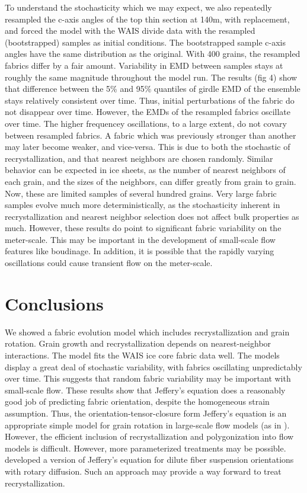 \documentclass{igs}
\begin{document}
To understand the stochasticity which we may expect, we also repeatedly resampled the c-axis angles of the top thin section at 140m, with replacement, and forced the model with the WAIS divide data with the resampled (bootstrapped) samples as initial conditions. The bootstrapped sample c-axis angles have the same distribution as the original. With 400 grains, the resampled fabrics differ by a fair amount. Variability in EMD between samples stays at roughly the same magnitude throughout the model run. The results (fig 4) show that difference between the 5\% and 95\% quantiles of girdle EMD of the ensemble stays relatively consistent over time. Thus, initial perturbations of the fabric do not disappear over time.  However, the EMDs of the resampled fabrics oscillate over time. The higher frequencey oscillations, to a large extent, do not covary between resampled fabrics. A fabric which was previously stronger than another may later become weaker, and vice-versa. This is due to both the stochastic of recrystallization, and that nearest neighbors are chosen randomly. Similar behavior can be expected in ice sheets, as the number of nearest neighbors of each grain, and the sizes of the neighbors, can differ greatly from grain to grain. Now, these are limited samples of several hundred grains. Very large fabric samples evolve much more deterministically, as the stochasticity inherent in recrystallization and nearest neighbor selection does not affect bulk properties as much. However, these results do point to significant fabric variability on the meter-scale. This may be important in the development of small-scale flow features like boudinage. In addition, it is possible that the rapidly varying oscillations could cause transient flow on the meter-scale. 


\section{Conclusions}
We showed a fabric evolution model which includes recrystallization and grain rotation. Grain growth and recrystallization depends on nearest-neighbor interactions. The model fits the WAIS ice core fabric data well. The models display a great deal of stochastic variability, with fabrics oscillating unpredictably over time. This suggests that random fabric variability may be important with small-scale flow. These results show that Jeffery's equation does a reasonably good job of predicting fabric orientation, despite the homogeneous strain assumption. Thus, the orientation-tensor-closure form  Jeffery's equation is an appropriate simple model for grain rotation in large-scale flow models (as in \citet{gillet2006}). However, the efficient inclusion of recrystallization and polygonization into flow models is difficult. However, more parameterized treatments may be possible. \citet{folgar1984} developed a version of Jeffery's equation for dilute fiber suspension orientations with rotary diffusion. Such an approach may provide a way forward to treat recrystallization. 
\end{document}
